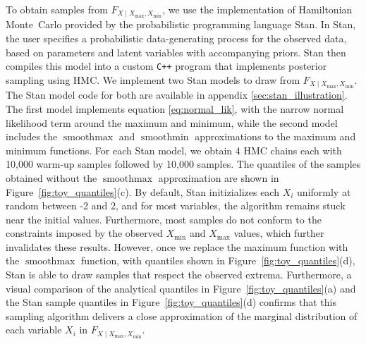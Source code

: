 \documentclass[letter]{article}
\DeclareMathOperator*{\softmax}{smoothmax}
\DeclareMathOperator*{\softmin}{smoothmin}
\newcommand{\Xmax}{X_{\max}}
\newcommand{\Xmin}{X_{\min}}
\newcommand{\Fcond}{F_{X \mid \Xmax,\Xmin}}
\begin{document}
To obtain samples from \(\Fcond\), we use the implementation of Hamiltonian Monte~Carlo provided by the probabilistic programming language Stan.
In Stan, the user specifies a probabilistic data-generating process for the observed data, based on parameters and latent variables with accompanying priors.
Stan then compiles this model into a custom \texttt{C++} program that implements
posterior sampling using HMC.
We implement two Stan models to draw from \(\Fcond\).
The Stan model code for both are available in appendix \ref{sec:stan_illustration}.
The first model implements equation \eqref{eq:normal_lik},
with the narrow normal likelihood term around the maximum and minimum,
while the second model includes the \(\softmax\) and \(\softmin\) approximations to the maximum and minimum functions.
For each Stan model, we obtain 4 HMC chains each with 10,000 warm-up samples followed by 10,000 samples.
The quantiles of the samples obtained without the \(\softmax\) approximation are shown in Figure~\ref{fig:toy_quantiles}(c).
By default, Stan initizializes each \(X_i\) uniformly at random between -2 and 2,
and for most variables, the algorithm remains stuck near the initial values.
Furthermore, most samples do not conform to the constraints imposed by the observed \(\Xmin\) and \(\Xmax\) values, which further invalidates these results.
However, once we replace the maximum function with the \(\softmax\) function,
with quantiles shown in Figure~\ref{fig:toy_quantiles}(d),
Stan is able to draw samples that respect the observed extrema.
Furthermore, a visual comparison of the analytical quantiles in Figure~\ref{fig:toy_quantiles}(a)
and the Stan sample quantiles in Figure~\ref{fig:toy_quantiles}(d) confirms that
this sampling algorithm delivers a close approximation of the marginal distribution of each variable \(X_i\) in \(\Fcond\).
    
\end{document}
